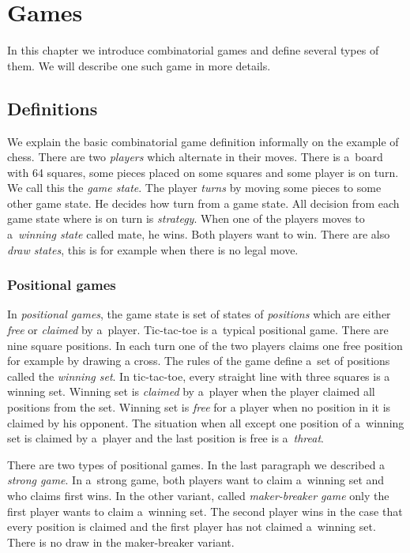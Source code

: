 \chapter{Games}

In this chapter we introduce  combinatorial games and define several types of
them. We will describe one such game in more details. 

\section{Definitions}

We explain the basic combinatorial game definition informally on the example of
chess. There are two \emph{players} which alternate in their moves. There is
a~board with 64 squares, some pieces placed on some squares and some player is
on turn. We call this the \emph{game state}. The player \emph{turns} by moving
some pieces to some other game state. 
He decides how turn from a game state. All decision from each game state where
is on turn is \emph{strategy}.
When one of the players moves to a~\emph{winning
state} called mate, he wins. Both players want to win. There are also \emph{draw
states}, this is for example when there is no legal move. 

\subsection{Positional games}

In \emph{positional games}, the game state is set of states of
\emph{positions} which are either \emph{free} or \emph{claimed} by a~player.
Tic-tac-toe is a~typical positional game. There are nine square positions. In
each turn one of the two players claims one free position for example by drawing a
cross. The rules of the game define a~set of positions called the \emph{winning
set}. In tic-tac-toe, every straight line with three squares is a winning set.
Winning set is \emph{claimed} by a~player when the player claimed all positions
from the set. Winning set is \emph{free} for a player when no position in it is
claimed by his opponent. The situation when all except one position of
a~winning set is claimed by a~player and the last position is free is
a~\emph{threat}.

There are two types of positional games. In the last paragraph we described a
\emph{strong game}. In a~strong game, both players want to claim a~winning set
and who claims first wins. In the other variant, called \emph{maker-breaker
game} only the first player wants to claim a~winning set. The second player wins in the
case that every position is claimed and the first player has not claimed a~winning
set. There is no draw in the maker-breaker variant.

